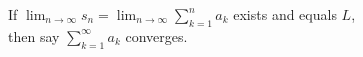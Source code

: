 \documentclass[border=6pt]{standalone}
\begin{document}
\parbox{3in}{If $\displaystyle\lim_{n\to\infty} s_n = \displaystyle\lim_{n\to\infty} \sum_{k=1}^n a_k$ exists and equals $L$, \\
then say $\displaystyle\sum_{k=1}^\infty a_k$ converges.}
\end{document}
